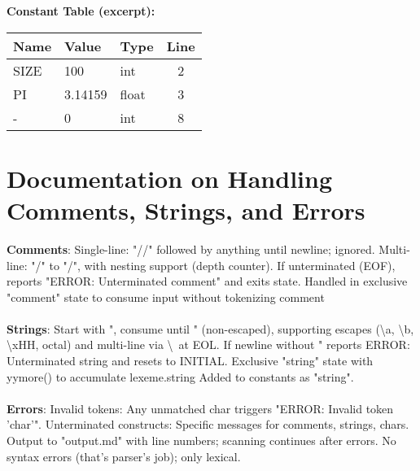 \documentclass{article}
\begin{document}
\bigskip
\textbf{Constant Table (excerpt):}
\begin{center}
\begin{tabular}{|l|l|l|c|}
\hline
Name & Value   & Type   & Line \\
\hline
SIZE & 100     & int    & 2 \\
PI   & 3.14159 & float  & 3 \\
-    & 0       & int    & 8 \\
\hline
\end{tabular}
\end{center}

\section{Documentation on Handling Comments, Strings, and Errors} \textbf{Comments}: Single-line: "//" followed by anything until newline; ignored. Multi-line: "/" to "/", with nesting support (depth counter). If unterminated (EOF), reports "ERROR: Unterminated comment" and exits state. Handled in exclusive "comment" state to consume input without tokenizing comment \\
\\
\textbf{Strings}: Start with ", consume until " (non-escaped), supporting escapes (\textbackslash a, \textbackslash b, \textbackslash xHH, octal) and multi-line via \textbackslash\ at EOL. If newline without " reports ERROR: Unterminated string and resets to INITIAL. Exclusive "string" state with yymore() to accumulate lexeme.string Added to constants as "string". \\
\\
\textbf{Errors}: Invalid tokens: Any unmatched char triggers "ERROR: Invalid token 'char'". Unterminated constructs: Specific messages for comments, strings, chars. Output to "output.md" with line numbers; scanning continues after errors. No syntax errors (that's parser's job); only lexical. 
\end{document}
